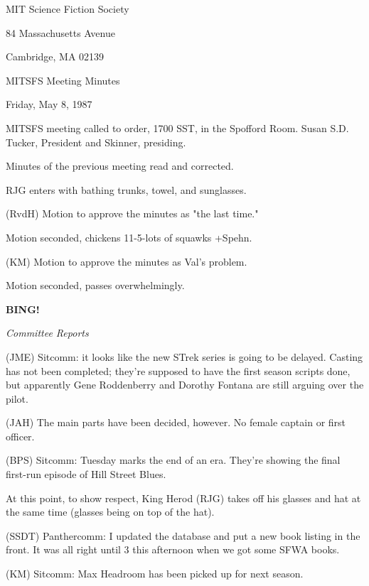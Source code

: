 \documentclass[12pt]{article}
\newcommand{\bing}{{\bf BING!} }
\newcommand{\goto}[1]{\bing \vskip 12pt \centerline{{\em{#1}}}}
\begin{document}
\begin{center}

MIT Science Fiction Society 

84 Massachusetts Avenue

Cambridge, MA 02139

\vspace{12pt}

MITSFS Meeting Minutes 

Friday, May 8, 1987

\end{center}
 
\vspace{18pt}

\setlength{\parskip}{6pt}

\noindent
MITSFS meeting called to order, 1700 SST, in the Spofford Room. Susan S.D. Tucker, President and Skinner, presiding.

Minutes of the previous meeting read and corrected.

RJG enters with bathing trunks, towel, and sunglasses.

(RvdH) Motion to approve the minutes as "the last time."

Motion seconded, chickens 11-5-lots of squawks +Spehn.

(KM) Motion to approve the minutes as Val's problem.

Motion seconded, passes overwhelmingly.

\goto{Committee Reports}

(JME) Sitcomm: it looks like the new STrek series is going to be delayed. Casting has not been completed; they're supposed to have the first season scripts done, but apparently Gene Roddenberry and Dorothy Fontana are still arguing over the pilot.

(JAH) The main parts have been decided, however. No female captain or first officer.

(BPS) Sitcomm: Tuesday marks the end of an era. They're showing the final first-run episode of Hill Street Blues.

At this point, to show respect, King Herod (RJG) takes off his glasses and hat at the same time (glasses being on top of the hat).

(SSDT) Panthercomm: I updated the database and put a new book listing in the front. It was all right until 3 this afternoon when we got some SFWA books.

(KM) Sitcomm: Max Headroom has been picked up for next season.
\end{document}
